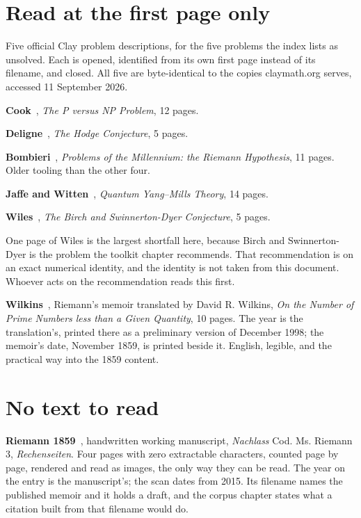 \section{Read at the first page only}

Five official Clay problem descriptions, for the five problems the index lists as unsolved. Each is
opened, identified from its own first page instead of its filename, and closed. All five are
byte-identical to the copies claymath.org serves, accessed 11 September 2026.

\textbf{Cook}~\cite{src:Cook}, \emph{The P versus NP Problem}, 12 pages.

\textbf{Deligne}~\cite{src:Deligne}, \emph{The Hodge Conjecture}, 5 pages.

\textbf{Bombieri}~\cite{src:Bombieri}, \emph{Problems of the Millennium: the Riemann Hypothesis}, 11
pages. Older tooling than the other four.

\textbf{Jaffe and Witten}~\cite{src:Jaffe-and-Witten}, \emph{Quantum Yang--Mills Theory}, 14 pages.

\textbf{Wiles}~\cite{src:Wiles}, \emph{The Birch and Swinnerton-Dyer Conjecture}, 5 pages.

One page of Wiles is the largest shortfall here, because Birch and Swinnerton-Dyer is the
problem the toolkit chapter recommends. That recommendation is on an exact numerical identity,
and the identity is not taken from this document. Whoever acts on the recommendation reads this
first.

\textbf{Wilkins}~\cite{src:Wilkins-1998}, Riemann's memoir translated by David R. Wilkins, \emph{On
the Number of Prime Numbers less than a Given Quantity}, 10 pages. The year is the translation's,
printed there as a preliminary version of December 1998; the memoir's date, November 1859, is
printed beside it. English, legible, and the practical way into the 1859 content.

\section{No text to read}

\textbf{Riemann 1859}~\cite{src:Riemann-1859}, handwritten working manuscript, \emph{Nachlass} Cod.
Ms. Riemann 3, \emph{Rechenseiten}. Four pages with zero extractable characters, counted page by
page, rendered and read as images, the only way they can be read. The year on the entry is the
manuscript's; the scan dates from 2015. Its filename names the published memoir and it holds a
draft, and the corpus chapter states what a citation built from that filename would do.

